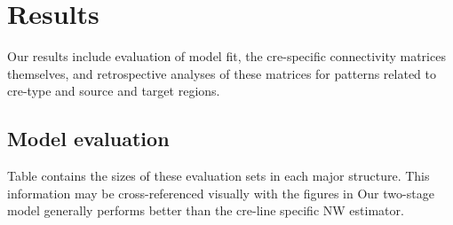 \documentclass[NETN,manuscript]{stjour-new}
\begin{document}





\section{Results}

Our results include evaluation of model fit, the cre-specific connectivity matrices themselves, and retrospective analyses of these matrices for  patterns related to cre-type and source and target regions.

\subsection{Model evaluation}
\label{sec:model_eval}

Table  contains the sizes of these evaluation sets in each major structure.
This information may be cross-referenced visually with the figures in 
Our two-stage model generally performs better than the cre-line specific NW estimator.
\end{document}
